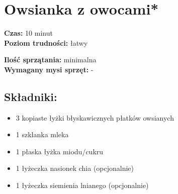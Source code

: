 \documentclass[a4paper,10pt]{book}
\begin{document}
\newpage 

\renewcommand{\contentsname}{Spis treści} 
\tableofcontents
\newpage

\chapter{Owsianka z owocami*}

\vspace{0.1cm}
\small
\begin{minipage}{0.45\textwidth}
    \noindent \textbf{Czas:} 10 minut\\
    \textbf{Poziom trudności:} łatwy 
\end{minipage}
\begin{minipage}{0.45\textwidth}
    \noindent \textbf{Ilość sprzątania:} minimalna\\
    \textbf{Wymagany mysi sprzęt:} -
\end{minipage}
\normalsize
\vspace{0.5cm}

\begin{multicols}{2}

\section*{Składniki:}
\begin{itemize}
    \item 3 kopiaste łyżki błyskawicznych płatków owsianych
    \item 1 szklanka mleka
    \item 1 płaska łyżka miodu/cukru
    \item 1 łyżeczka nasionek chia (opcjonalnie)
    \item 1 łyżeczka siemienia lnianego (opcjonalnie)
\end{itemize}

\columnbreak

\begin{figure}[H]
    \centering
\end{figure}


\end{multicols}
\end{document}
